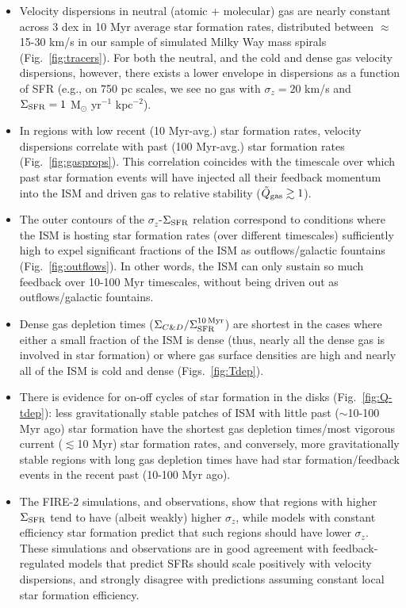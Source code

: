 \documentclass[usletter,fleqn,usenatbib]{mnras}
\begin{document}
\begin{itemize}
\item Velocity dispersions in neutral (atomic + molecular) gas are nearly constant across 3 dex in 10 Myr average star formation rates, distributed between $\approx$15-30 km/s in our sample of simulated Milky Way mass spirals (Fig.~\ref{fig:tracers}).  For both the neutral, and the cold and dense gas velocity dispersions, however, there exists a lower envelope in dispersions as a function of SFR (e.g., on 750 pc scales, we see no gas with $\sigma_z = 20$ km/s and $\Sigma_{\rm SFR} = 1$ M$_\odot$ yr$^{-1}$ kpc$^{-2}$).

\item In regions with low recent (10 Myr-avg.) star formation rates, velocity dispersions correlate with past (100 Myr-avg.) star formation rates (Fig.~\ref{fig:gasprops}).  This correlation coincides with the timescale over which past star formation events will have injected all their feedback momentum into the ISM and driven gas to relative stability ($\tilde Q_{\rm gas} \gtrsim 1$).  

\item The outer contours of the $\sigma_z$-$\Sigma_{\rm SFR}$ relation correspond to conditions where the ISM is hosting star formation rates (over different timescales) sufficiently high to expel significant fractions of the ISM as outflows/galactic fountains (Fig.~\ref{fig:outflows}).  In other words, the ISM can only sustain so much feedback over 10-100 Myr timescales, without being driven out as outflows/galactic fountains.

\item Dense gas depletion times ($\Sigma_{C\&D}/\Sigma_{\rm SFR}^{\rm 10 \, Myr}$) are shortest in the cases where either a small fraction of the ISM is dense (thus, nearly all the dense gas is involved in star formation) or where gas surface densities are high and nearly all of the ISM is cold and dense (Figs.~\ref{fig:Tdep}).

\item There is evidence for on-off cycles of star formation in the disks (Fig.~\ref{fig:Q-tdep}): less gravitationally stable patches of ISM with little past ($\sim$10-100 Myr ago) star formation have the shortest gas depletion times/most vigorous current ($\lesssim$10 Myr) star formation rates, and conversely, more gravitationally stable regions with long gas depletion times have had star formation/feedback events in the recent past (10-100 Myr ago).

\item The FIRE-2 simulations, and observations, show that regions with higher $\Sigma_{\rm SFR}$ tend to have (albeit weakly) higher $\sigma_z$, while models with constant efficiency star formation predict that such regions should have lower $\sigma_z$.  These simulations and observations are in good agreement with feedback-regulated models that predict SFRs should scale positively with velocity dispersions, and strongly disagree with predictions assuming constant local star formation efficiency.

\end{itemize}
\end{document}
